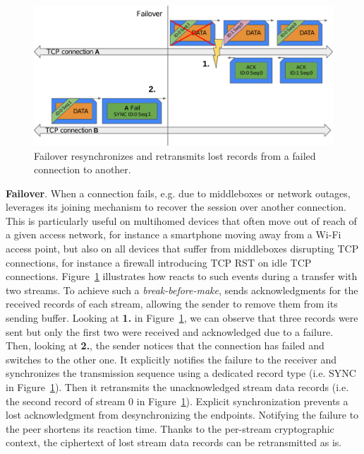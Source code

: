 \begin{figure}[!t]
	\begin{center}
		\includegraphics[width=\columnwidth]{figures/tcpls_failover}
	\end{center}
	\caption{Failover resynchronizes and retransmits lost \tcpls records 
	from a failed \tcp connection to another.}
	\label{fig:design-failover}
\end{figure}

\textbf{Failover}.
When a \tcp connection fails, e.g. due to middleboxes or network outages, 
\tcpls leverages its joining mechanism to recover 
the session over another \tcp connection. This is particularly useful on 
multihomed devices that often move out of reach of a given access network, for 
instance a smartphone moving away from a Wi-Fi access point, but also on all 
devices that suffer from middleboxes disrupting TCP connections, for instance a 
firewall introducing TCP RST on idle TCP connections.
Figure~\ref{fig:design-failover} 
illustrates 
how \tcpls reacts to such events during a transfer with two \tcpls streams.
To achieve such a \emph{break-before-make}, 
\tcpls sends acknowledgments for the received records of each stream, allowing
the sender to remove them from its sending buffer.
Looking at \textbf{1.} in Figure~\ref{fig:design-failover}, we can observe that 
three records were sent but only the first two were received and acknowledged 
due to a failure.
Then, looking at \textbf{2.}, the sender notices that the \tcp connection has 
failed and switches to the other one. It explicitly notifies the failure to the 
receiver and synchronizes the transmission sequence using a 
dedicated \tcpls record type (i.e. SYNC in Figure~\ref{fig:design-failover}). 
Then it retransmits the unacknowledged stream data records (i.e. the second 
record of stream 0 in Figure~\ref{fig:design-failover}). 
Explicit synchronization %
prevents a lost acknowledgment from desynchronizing the endpoints. 
Notifying the failure to the peer shortens its reaction time.
Thanks to the per-stream cryptographic context, the ciphertext of lost stream 
data records can be retransmitted as is.

